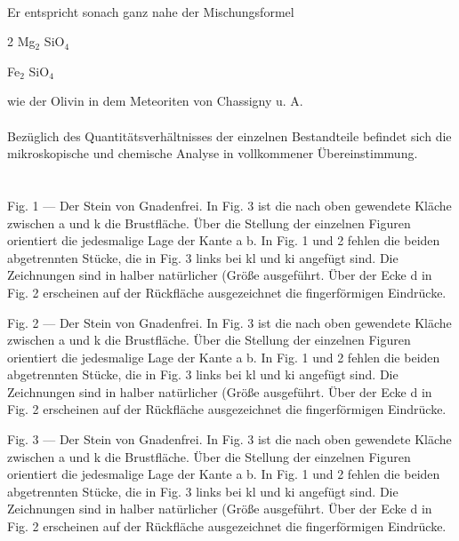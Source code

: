 \documentclass[a4paper, 11pt, oneside]{article}
\begin{document}
\paragraph{}
Er entspricht sonach ganz nahe der Mischungsformel
\large
\begin{center}
2 Mg$_{2}$ SiO$_{4}$
\end{center}
\begin{center}
Fe$_{2}$ SiO$_{4}$
\end{center}
\LARGE
wie der Olivin in dem Meteoriten von Chassigny u. A.
\paragraph{}
Bezüglich des Quantitätsverhältnisses der einzelnen Bestandteile befindet sich die mikroskopische und chemische Analyse in vollkommener Übereinstimmung.
\clearpage
\section{}
\paragraph{}
Fig. 1 --- Der Stein von Gnadenfrei. In Fig. 3 ist die nach oben gewendete Kläche zwischen a und k die Brustfläche. Über die Stellung der einzelnen Figuren orientiert die jedesmalige Lage der Kante a b. In Fig. 1 und 2 fehlen die beiden abgetrennten Stücke, die in Fig. 3 links bei kl und ki angefügt sind. Die Zeichnungen sind in halber natürlicher (Größe ausgeführt. Über der Ecke d in Fig. 2 erscheinen auf der Rückfläche ausgezeichnet die fingerförmigen Eindrücke.

Fig. 2 --- Der Stein von Gnadenfrei. In Fig. 3 ist die nach oben gewendete Kläche zwischen a und k die Brustfläche. Über die Stellung der einzelnen Figuren orientiert die jedesmalige Lage der Kante a b. In Fig. 1 und 2 fehlen die beiden abgetrennten Stücke, die in Fig. 3 links bei kl und ki angefügt sind. Die Zeichnungen sind in halber natürlicher (Größe ausgeführt. Über der Ecke d in Fig. 2 erscheinen auf der Rückfläche ausgezeichnet die fingerförmigen Eindrücke.

Fig. 3 --- Der Stein von Gnadenfrei. In Fig. 3 ist die nach oben gewendete Kläche zwischen a und k die Brustfläche. Über die Stellung der einzelnen Figuren orientiert die jedesmalige Lage der Kante a b. In Fig. 1 und 2 fehlen die beiden abgetrennten Stücke, die in Fig. 3 links bei kl und ki angefügt sind. Die Zeichnungen sind in halber natürlicher (Größe ausgeführt. Über der Ecke d in Fig. 2 erscheinen auf der Rückfläche ausgezeichnet die fingerförmigen Eindrücke.
\end{document}
